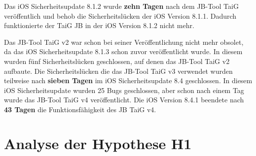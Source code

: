 Das iOS Sicherheitsupdate 8.1.2 wurde \textbf{zehn Tagen} nach dem JB-Tool TaiG veröffentlich und behob die Sicherheitslücken der iOS Version 8.1.1. Dadurch funktionierte der TaiG JB in der iOS Version 8.1.2 nicht mehr.

Das JB-Tool TaiG v2 war schon bei seiner Veröffentlichung nicht mehr obsolet, da das iOS Sicherheitsupdate 8.1.3 schon zuvor veröffentlicht wurde. In diesem wurden fünf Sicherheitslücken geschlossen, auf denen das JB-Tool TaiG v2 aufbaute.
Die Sicherheitslücken die das JB-Tool TaiG v3 verwendet wurden teilweise nach \textbf{sieben Tagen} im iOS Sicherheitsupdate 8.4 geschlossen. In diesem iOS Sicherheitsupdate wurden 25 Bugs geschlossen, aber schon nach einem Tag wurde das JB-Tool TaiG v4 veröffentlicht. Die iOS Version 8.4.1 beendete nach \textbf{43 Tagen} die Funktionsfähigkeit des JB TaiG v4.
\newpage
\section{Analyse der Hypothese H1}
\label{sec:AnalyseHypo}




        